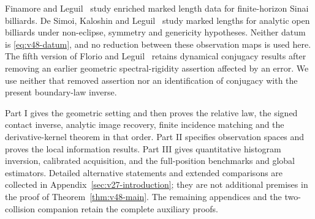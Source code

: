Finamore and Leguil~\cite{FinamoreLeguil} study enriched marked length
data for finite-horizon Sinai billiards.  De Simoi, Kaloshin and
Leguil~\cite{DSKL} study marked lengths for analytic open billiards
under non-eclipse, symmetry and genericity hypotheses.  Neither datum
is \eqref{eq:v48-datum}, and no reduction between these observation
maps is used here.  The fifth version of Florio and
Leguil~\cite{FlorioLeguil} retains dynamical conjugacy results after
removing an earlier geometric spectral-rigidity assertion affected by
an error.  We use neither that removed assertion nor an identification
of conjugacy with the present boundary-law inverse.



Part I gives the geometric setting and then proves the relative law,
the signed contact inverse, analytic image recovery, finite incidence
matching and the derivative-kernel theorem in that order.  Part II
specifies observation spaces and proves the local information results.
Part III gives quantitative histogram inversion, calibrated acquisition,
and the full-position benchmarks and global estimators.  Detailed
alternative statements and extended comparisons are collected in
Appendix~\ref{sec:v27-introduction}; they are not additional premises
in the proof of Theorem~\ref{thm:v48-main}.  The remaining appendices
and the two-collision companion retain the complete auxiliary proofs.
